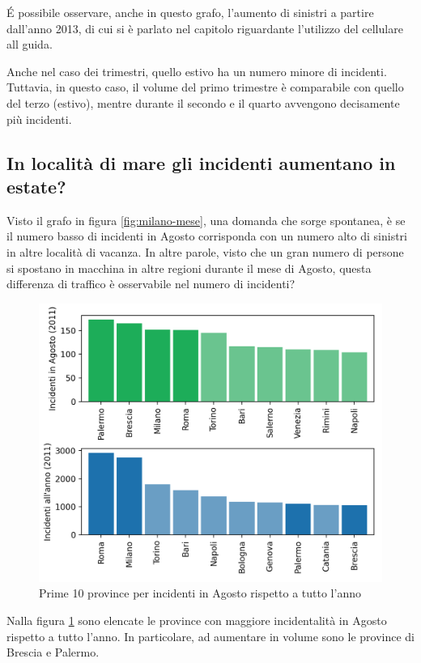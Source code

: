 \documentclass[a4paper,12pt]{report}
\begin{document}
\'E possibile osservare, anche in questo grafo, l'aumento di sinistri a partire dall'anno 2013, 
di cui si è parlato nel capitolo riguardante l'utilizzo del cellulare all guida.

Anche nel caso dei trimestri, quello estivo ha un numero minore di incidenti. 
Tuttavia, in questo caso, il volume del primo trimestre è comparabile con quello del terzo 
(estivo), mentre durante il secondo e il quarto avvengono decisamente più incidenti.


\subsection{In località di mare gli incidenti aumentano in estate?}

Visto il grafo in figura \ref{fig:milano-mese}, una domanda che sorge spontanea, è se 
il numero basso di incidenti in Agosto corrisponda con un numero alto di sinistri in 
altre località di vacanza. 
In altre parole, visto che un gran numero di persone si spostano in macchina 
in altre regioni durante il mese di Agosto, questa differenza di traffico è osservabile 
nel numero di incidenti?

\begin{figure}
    \includegraphics[width=\linewidth]{../src/incidenti/incidenti_senza_coords/mese_incidenti/mesi_estivi.png}
    \caption{Prime 10 province per incidenti in Agosto rispetto a tutto l'anno}
    \label{fig:mesi-estivi}
\end{figure}

Nalla figura \ref{fig:mesi-estivi} sono elencate le province con maggiore incidentalità 
in Agosto rispetto a tutto l'anno. In particolare, ad aumentare in volume sono le 
province di Brescia e Palermo.
\end{document}
